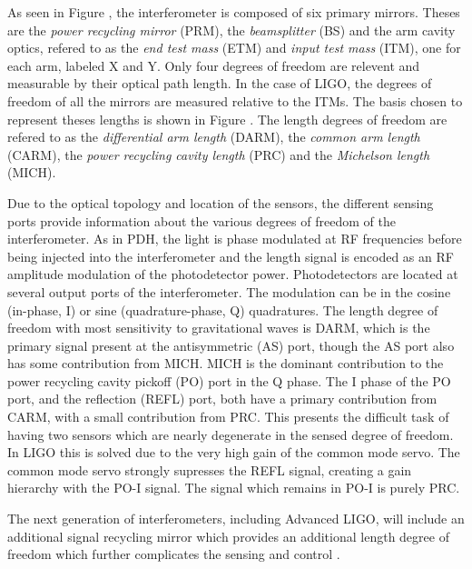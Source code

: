 As seen in Figure , the interferometer is composed of six primary mirrors. %
Theses are the \emph{power recycling mirror} (PRM), the \emph{beamsplitter} (BS) and the arm cavity optics, refered to as the \emph{end test mass} (ETM) and \emph{input test mass} (ITM), one for each arm, labeled X and Y. %
Only four degrees of freedom are relevent and measurable by their optical path length. %
In the case of LIGO, the degrees of freedom of all the mirrors are measured relative to the ITMs. %
The basis chosen to represent theses lengths is shown in Figure . %
The length degrees of freedom are refered to as the \emph{differential arm length} (DARM), the \emph{common arm length} (CARM), the \emph{power recycling cavity length} (PRC) and the \emph{Michelson length} (MICH).

Due to the optical topology and location of the sensors, the different sensing ports provide information about the various degrees of freedom of the interferometer. %
As in PDH, the light is phase modulated at RF frequencies before being injected into the interferometer and the length signal is encoded as an RF amplitude modulation of the photodetector power. %
Photodetectors are located at several output ports of the interferometer. %
The modulation can be in the cosine (in-phase, I) or sine (quadrature-phase, Q) quadratures. %
The length degree of freedom with most sensitivity to gravitational waves is DARM, which is the primary signal present at the antisymmetric (AS) port, though the AS port also has some contribution from MICH. %
MICH is the dominant contribution to the power recycling cavity pickoff (PO) port in the Q phase. %
The I phase of the PO port, and the reflection (REFL) port, both have a primary contribution from CARM, with a small contribution from PRC. %
This presents the difficult task of having two sensors which are nearly degenerate in the sensed degree of freedom. %
In LIGO this is solved due to the very high gain of the common mode servo. %
The common mode servo strongly supresses the REFL signal, creating a gain hierarchy with the PO-I signal. %
The signal which remains in PO-I is purely PRC.

The next generation of interferometers, including Advanced LIGO, will include an additional signal recycling mirror which provides an additional length degree of freedom which further complicates the sensing and control \cite{T1000298}.

